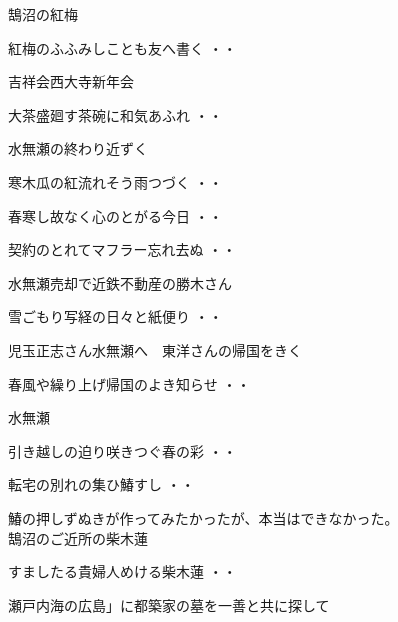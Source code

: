 \vspace{0.6cm}
\noindent 鵠沼の紅梅
\begin{shiika}紅梅のふふみしことも友へ書く
\hfill{・・}\end{shiika}
\vspace{0.6cm}
吉祥会西大寺新年会
\begin{shiika}大茶盛廻す茶碗に和気あふれ
\hfill{・・}\end{shiika}
\vspace{0.6cm}
水無瀬の終わり近ずく
\begin{shiika}寒木瓜の紅流れそう雨つづく
\hfill{・・}\end{shiika}
\begin{shiika}春寒し故なく心のとがる今日
\hfill{・・}\end{shiika}
\begin{shiika}契約のとれてマフラー忘れ去ぬ
\hfill{・・}\end{shiika}
\qquad\qquad\qquad 水無瀬売却で近鉄不動産の勝木さん
\vspace{0.6cm}
\begin{shiika}雪ごもり写経の日々と紙便り
\hfill{・・}\end{shiika}
\vspace{0.6cm}
児玉正志さん水無瀬へ　東洋さんの帰国をきく
\begin{shiika}春風や繰り上げ帰国のよき知らせ
\hfill{・・}\end{shiika}
\vspace{0.6cm}
水無瀬
\begin{shiika}引き越しの迫り咲きつぐ春の彩
\hfill{・・}\end{shiika}
\begin{shiika}転宅の別れの集ひ鰆すし
\hfill{・・}\end{shiika}
\qquad\qquad\qquad 鰆の押しずぬきが作ってみたかったが、本当はできなかった。\\
\vspace{0.6cm}
\noindent
鵠沼のご近所の柴木蓮
\begin{shiika}すましたる貴婦人めける柴木蓮
\hfill{・・}\end{shiika}
\vspace{0.6cm}
瀬戸内海の広島」に都築家の墓を一善と共に探して
